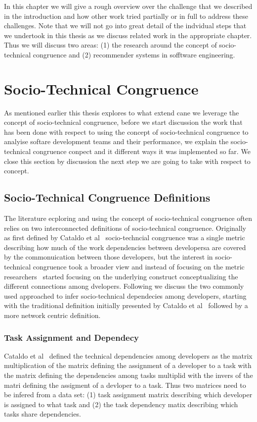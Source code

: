In this chapter we will give a rough overview over the challenge that we described in the introduction and how other work tried partially or in full to address these challenges.
Note that we will not go into great detail of the indvidual steps that we undertook in this thesis as we discuss related work in the appropriate chapter.
Thus we will discuss two areas: (1) the research around the concept of socio-technical congruence and (2) recommender systems in sofftware engineering.

\section{Socio-Technical Congruence}
As mentioned earlier this thesis explores to what extend cane we leverage the concept of socio-technical congruence, before we start discussion the work that has been done with respect to using the concept of socio-technical congruence to analyise softare development teams and their performance, we explain the socio-technical congruence conpect and it different ways it was implemented so far.
We close this section by discussion the next step we are going to take with respect to concept.

\subsection{Socio-Technical Congruence Definitions}
The literature ecploring and using the concept of socio-technical congruence often relies on two interconnected definitions of socio-technical congruence.
Originally as first defined by Cataldo et al~\cite{} socio-techncial congruence was a single metric describing how much of the work dependencies between developersa are covered by the commonuication between those developers, but the interest in socio-technical congruence took a broader view and instead of focusing on the metric researchers~\cite{} started focusing on the underlying construct conceptualizing the different connections among dvelopers.
Following we discuss the two commonly used approached to infer socio-technical dependecies among developers, starting with the traditional definition initially presented by Cataldo et al~\cite{} followed by a more network centric definition.

\subsubsection{Task Assignment and Dependecy}
Cataldo et al~\cite{} defined the technical dependencies among developers as the matrix multiplication of the matrix defining the assignment of a developer to a task with the matrix defining the dependencies among tasks multiplid with the invers of the matri defining the assigment of a devloper to a task.
Thus two matrices need to be infered from a data set: (1) task assignment matrix describing which developer is assigned to what task and (2) the task dependency matix describing which tasks share dependencies.


